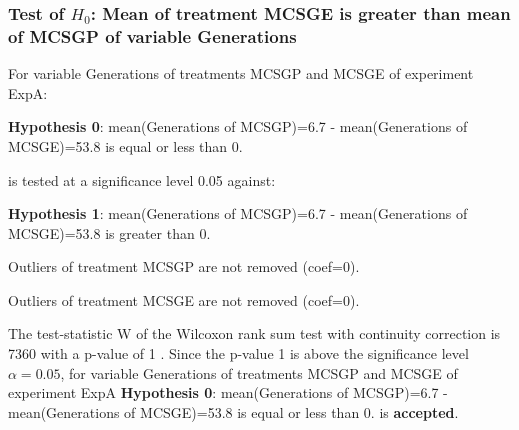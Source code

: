 \documentclass[18pt,c]{beamer}
\begin{document}
\begin{frame}[t]
 \frametitle{Test of $H_{0}$: Mean of treatment MCSGE is greater than mean of MCSGP of variable Generations }
 \scriptsize
 For variable Generations of treatments MCSGP and MCSGE of experiment ExpA:

\vspace{1mm}
{\bf Hypothesis 0}: mean(Generations of MCSGP)=6.7 - mean(Generations of MCSGE)=53.8 is equal or less than 0.


 \begin{center} is tested at a significance level 0.05 against: \end{center}

{\bf Hypothesis 1}: mean(Generations of MCSGP)=6.7 - mean(Generations of MCSGE)=53.8 is greater than 0.
\vspace{1mm}
\vspace{1mm}

 Outliers of treatment MCSGP  are not removed (coef=0).

 Outliers of treatment MCSGE  are not removed (coef=0).
\vspace{1mm}
 
 The test-statistic W of the Wilcoxon rank sum test with continuity correction is 7360 with a p-value of 1 .
 Since the p-value 1 is above the significance level $\alpha= 0.05 $,
 for variable Generations of treatments MCSGP and MCSGE of experiment ExpA 
 {\bf Hypothesis 0}: mean(Generations of MCSGP)=6.7 - mean(Generations of MCSGE)=53.8 is equal or less than 0.
is {\bf accepted}.

 \end{frame}
\end{document}
